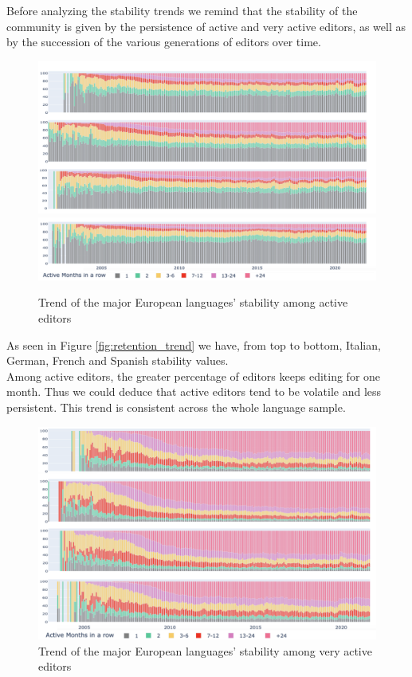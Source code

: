Before analyzing the stability trends we remind that the stability of the community is given by the persistence of active and very active editors, as well as by the succession of the various generations of editors over time.\\

\begin{figure}[h]
    \centering
    \includegraphics[width=460px]{img/stability_trend.png}
    \includegraphics[width=460px]{img/stability_trend1.png}
    \caption{Trend of the major European languages' stability among active editors}
    \label{fig:stability_trend}
\end{figure}
\pagebreak

As seen in Figure \ref{fig:retention_trend} we have, from top to bottom, Italian, German, French and Spanish stability values.\\
Among active editors, the greater percentage of editors keeps editing for one month. Thus we could deduce that active editors tend to be volatile and less persistent. This trend is consistent across the whole language sample.\\

\begin{figure}[h]
    \centering
    \includegraphics[width=480px]{img/stability_trend_v.png}
    \caption{Trend of the major European languages' stability among very active editors}
    \label{fig:stability_trend_v}
\end{figure}

